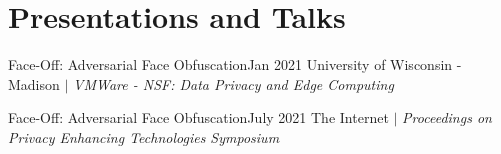 \section{Presentations and Talks}
  \CVSubHeadingListStart
    \CVSubheading
      {{Face-Off: Adversarial Face Obfuscation}\cite{FaceOff}}{Jan 2021}
      {{University of Wisconsin - Madison} $|$ \emph{\small{VMWare - NSF: Data Privacy and Edge Computing}}}{}
      
    \CVSubheading
      {{Face-Off: Adversarial Face Obfuscation}\cite{FaceOff}}{July 2021}
      {{The Internet} $|$ \emph{\small{Proceedings on Privacy Enhancing Technologies Symposium}}}{}
  \CVSubHeadingListEnd
